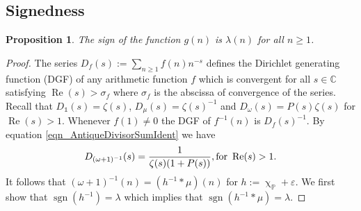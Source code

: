 \documentclass[11pt,reqno,a4letter]{article}
\numberwithin{equation}{section}
\numberwithin{figure}{section}
\numberwithin{table}{section}
\renewcommand{\chi}{\upchi}
\theoremstyle{plain}
\newtheorem{prop}[theorem]{Proposition}
\numberwithin{theorem}{section}
\theoremstyle{definition}
\theoremstyle{remark}
\renewcommand{\Re}{\operatorname{Re}}
\newcommand{\mathtext}[1]{\text{\rm #1}}
\begin{document}
\subsection{Signedness}
\label{Section_PrelimProofs_Config} 
\label{subSection_ProofOfSignednessOfgInvn_v1} 

\begin{prop}
\label{prop_SignageDirInvsOfPosBddArithmeticFuncs_v1} 
The sign of the function $g(n)$ is $\lambda(n)$ for all $n \geq 1$. 
\end{prop} 
\begin{proof} 
The series $D_f(s) := \sum_{n \geq 1} f(n) n^{-s}$ defines the 
Dirichlet generating function (DGF) of any 
arithmetic function $f$ which is convergent for all $s \in \mathbb{C}$ satisfying 
$\Re(s) > \sigma_f$ where $\sigma_f$ is the abscissa of convergence of the series. 
Recall that $D_{\mathds{1}}(s) = \zeta(s)$, $D_{\mu}(s) = \zeta(s)^{-1}$ and 
$D_{\omega}(s) = P(s) \zeta(s)$ for $\Re(s) > 1$. 
Whenever $f(1) \neq 0$ the DGF of $f^{-1}(n)$ is $D_f(s)^{-1}$. 
By equation \eqref{eqn_AntiqueDivisorSumIdent} we have 
\begin{align} 
\label{eqn_DGF_of_gInvn} 
D_{(\omega+1)^{-1}}(s) = \frac{1}{\zeta(s) (1+P(s))}, \mathtext{ for } \Re(s) > 1. 
\end{align} 
It follows that $(\omega + 1)^{-1}(n) = (h^{-1} \ast \mu)(n)$ for 
$h := \chi_{\mathbb{P}} + \varepsilon$. 
We first show that $\operatorname{sgn}(h^{-1}) = \lambda$ which implies that 
$\operatorname{sgn}(h^{-1} \ast \mu) = \lambda$. 


\end{proof}
\end{document}
